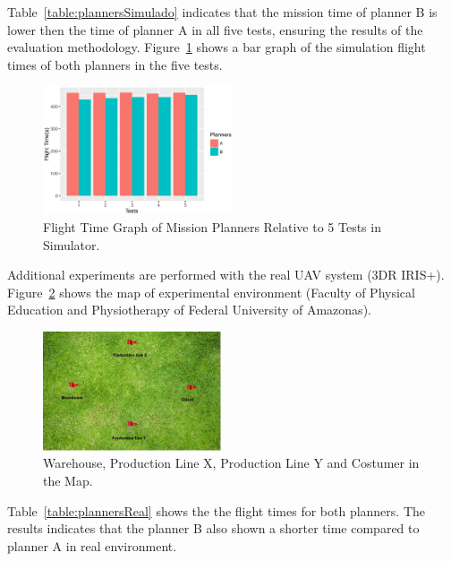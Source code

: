 \documentclass[conference,harvard,brazil,english]{sbatex}
\begin{document}
Table~\ref{table:plannersSimulado} indicates that the mission time of planner B is lower then the time of planner A in all five tests, ensuring the results of the evaluation methodology. Figure~\ref{fig:GraPlannersSimulado} shows a bar graph of the simulation flight times of both planners in the five tests.

\begin{figure}[H]
	\centering
	\includegraphics[width=0.5\textwidth]{GraPlannersSimulado.eps}
	\caption{Flight Time Graph of Mission Planners Relative to 5 Tests in Simulator.\label{fig:GraPlannersSimulado}}
	\end{figure}
	
Additional experiments are performed with the real UAV system (3DR IRIS+). Figure~\ref{fig:maps} shows the map of experimental environment (Faculty of Physical Education and Physiotherapy of Federal University of Amazonas).

		\begin{figure}[H]
	\centering
	\includegraphics[width=0.47\textwidth]{map.eps}
	\caption{Warehouse, Production Line X, Production Line Y and Costumer in the Map.\label{fig:maps}}
	\end{figure}
	
Table~\ref{table:plannersReal} shows the the flight times for both planners. The results indicates that the planner B also shown a shorter time compared to planner A in real environment.
	
\end{document}
